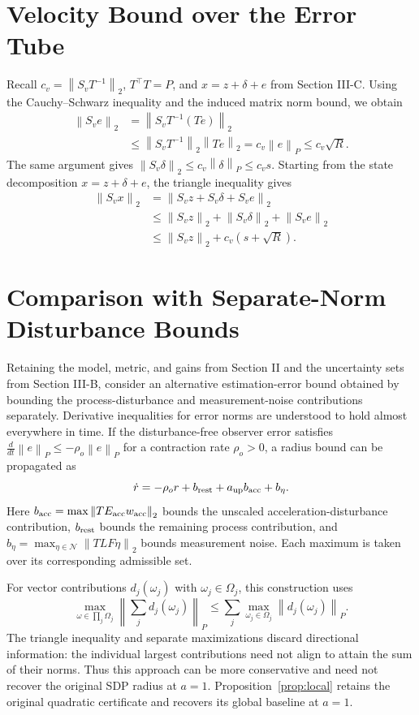 \documentclass[11pt,a4paper]{article}
\numberwithin{equation}{section}
\theoremstyle{remark}\newtheorem{remark}{Remark}
\newcommand{\norm}[1]{\left\lVert#1\right\rVert}
\begin{document}
\section{Velocity Bound over the Error Tube}\label{app:velocity-bound}
Recall $c_v=\norm{S_vT^{-1}}_2$, $T^\top T=P$, and $x=z+\delta+e$ from Section III-C.
Using the Cauchy--Schwarz inequality and the induced matrix norm bound, we obtain
\begin{align*}
\norm{S_ve}_2
&=\norm{S_vT^{-1}(Te)}_2\\
&\le\norm{S_vT^{-1}}_2\norm{Te}_2
=c_v\norm e_P\le c_v\sqrt R.
\end{align*}
The same argument gives $\norm{S_v\delta}_2\le c_v\norm\delta_P\le c_vs$.
Starting from the state decomposition $x=z+\delta+e$, the triangle inequality gives
\begin{align*}
\norm{S_vx}_2
&=\norm{S_vz+S_v\delta+S_ve}_2\\
&\le\norm{S_vz}_2+\norm{S_v\delta}_2+\norm{S_ve}_2\\
&\le\norm{S_vz}_2+c_v(s+\sqrt R).
\end{align*}

\section{Comparison with Separate-Norm Disturbance Bounds}\label{app:separate-norm}
Retaining the model, metric, and gains from Section II and the uncertainty sets from Section III-B, consider an alternative estimation-error bound obtained by bounding the process-disturbance and measurement-noise contributions separately. Derivative inequalities for error norms are understood to hold almost everywhere in time. If the disturbance-free observer error satisfies $\frac{d}{dt}\norm e_P\le-\rho_o\norm e_P$ for a contraction rate $\rho_o>0$, a radius bound can be propagated as
\begin{equation}
\dot r=-\rho_o r+b_{\rm rest}+a_{\rm up}b_{\rm acc}+b_\eta.
\end{equation}
Here $b_{\rm acc}=\max\norm{TE_{\rm acc}w_{\rm acc}}_2$ bounds the unscaled acceleration-disturbance contribution, $b_{\rm rest}$ bounds the remaining process contribution, and $b_\eta=\max_{\eta\in\mathcal N}\norm{TLF\eta}_2$ bounds measurement noise. Each maximum is taken over its corresponding admissible set.

For vector contributions $d_j(\omega_j)$ with $\omega_j\in\Omega_j$, this construction uses
\[
\max_{\omega\in\prod_j\Omega_j}\left\|\sum_j d_j(\omega_j)\right\|_P
\le\sum_j\max_{\omega_j\in\Omega_j}\norm{d_j(\omega_j)}_P.
\]
The triangle inequality and separate maximizations discard directional information: the individual largest contributions need not align to attain the sum of their norms. Thus this approach can be more conservative and need not recover the original SDP radius at $a=1$. Proposition~\ref{prop:local} retains the original quadratic certificate and recovers its global baseline at $a=1$.
\end{document}
